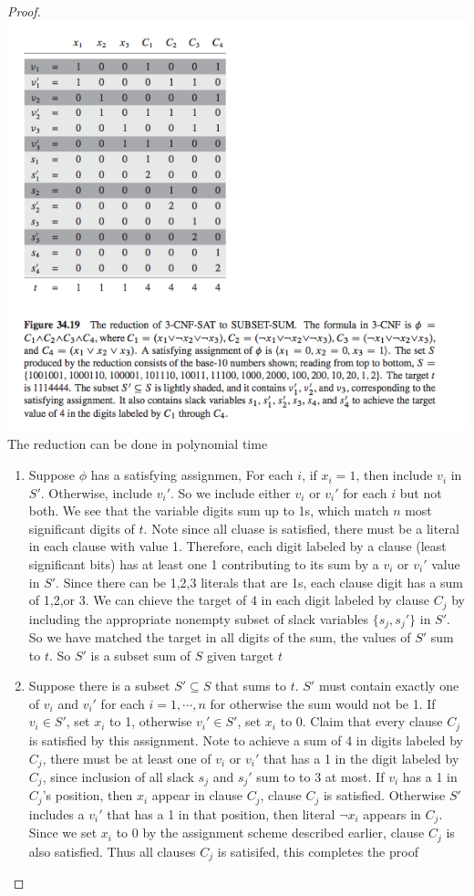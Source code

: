 \documentclass[11pt]{article}
\begin{document}
\begin{theorem*}
\begin{enumerate}
\begin{proof}
            \includegraphics[width=\textwidth]{ss_npc.png} 
            The reduction can be done in polynomial time 
            \begin{enumerate}
                \item Suppose $\phi$ has a satisfying assignmen, For each $i$, if $x_i = 1$, then include $v_i$ in $S'$. Otherwise, include $v_i'$. So we include either $v_i$ or $v_i'$ for each $i$ but not both. We see that the variable digits sum up to 1s, which match $n$ most significant digits of $t$. Note since all cluase is satisfied, there must be a literal in each clause with value 1. Therefore, each digit labeled by a clause (least significant bits) has at least one 1 contributing to its sum by a $v_i$ or $v_i'$ value in $S'$. Since there can be 1,2,3 literals that are 1s, each clause digit has a sum of 1,2,or 3. We can chieve the target of 4 in each digit labeled by clause $C_j$ by including the appropriate nonempty subset of slack variables $\{s_j, s_j'\}$ in $S'$. So we have matched the target in all digits of the sum, the values of $S'$ sum to $t$. So $S'$ is a subset sum of $S$ given target $t$
                \item Suppose there is a subset $S' \subseteq S$ that sums to $t$. $S'$ must contain exactly one of $v_i$ and $v_i'$ for each $i = 1,\cdots, n$ for otherwise the sum would not be 1. If $v_i \in S'$, set $x_i$ to 1, otherwise $v_i' \in S'$, set $x_i$ to 0. Claim that every clause $C_j$ is satisfied by this assignment. Note to achieve a sum of 4 in digits labeled by $C_j$, there must be at least one of $v_i$ or $v_i'$ that has a 1 in the digit labeled by $C_j$, since inclusion of all slack $s_j$ and $s_j'$ sum to to 3 at most. If $v_i$ has a 1 in $C_j$'s position, then $x_i$ appear in clause $C_j$, clause $C_j$ is satisfied. Otherwise $S'$ includes a $v_i'$ that has a 1 in that position, then literal $\neg x_i$ appears in $C_j$. Since we set $x_i$ to 0 by the assignment scheme described earlier, clause $C_j$ is also satisfied. Thus all clauses $C_j$ is satisifed, this completes the proof

\end{enumerate}
\end{proof}
\end{enumerate}
\end{theorem*}
\end{document}
